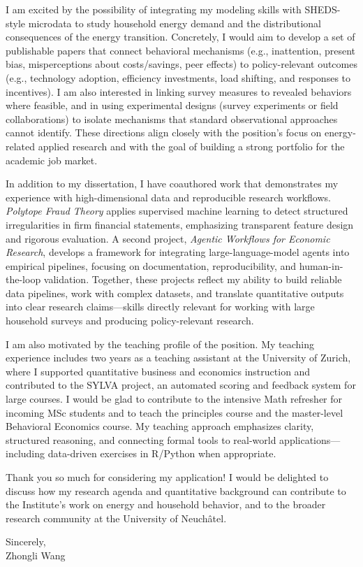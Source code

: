 \documentclass[11pt]{article}
\begin{document}
I am excited by the possibility of integrating my modeling skills with SHEDS-style microdata to study household energy demand and the distributional consequences of the energy transition. 
Concretely, I would aim to develop a set of publishable papers that connect behavioral mechanisms (e.g., inattention, present bias, misperceptions about costs/savings, peer effects) to policy-relevant outcomes (e.g., technology adoption, efficiency investments, load shifting, and responses to incentives). 
I am also interested in linking survey measures to revealed behaviors where feasible, and in using experimental designs (survey experiments or field collaborations) to isolate mechanisms that standard observational approaches cannot identify. 
These directions align closely with the position's focus on energy-related applied research and with the goal of building a strong portfolio for the academic job market.

In addition to my dissertation, I have coauthored work that demonstrates my experience with high-dimensional data and reproducible research workflows. 
\textit{Polytope Fraud Theory} applies supervised machine learning to detect structured irregularities in firm financial statements, emphasizing transparent feature design and rigorous evaluation. 
A second project, \textit{Agentic Workflows for Economic Research}, develops a framework for integrating large-language-model agents into empirical pipelines, focusing on documentation, reproducibility, and human-in-the-loop validation. 
Together, these projects reflect my ability to build reliable data pipelines, work with complex datasets, and translate quantitative outputs into clear research claims---skills directly relevant for working with large household surveys and producing policy-relevant research.

I am also motivated by the teaching profile of the position. 
My teaching experience includes two years as a teaching assistant at the University of Zurich, where I supported quantitative business and economics instruction and contributed to the SYLVA project, an automated scoring and feedback system for large courses. 
I would be glad to contribute to the intensive Math refresher for incoming MSc students and to teach the principles course and the master-level Behavioral Economics course. 
My teaching approach emphasizes clarity, structured reasoning, and connecting formal tools to real-world applications---including data-driven exercises in R/Python when appropriate.

Thank you so much for considering my application!
I would be delighted to discuss how my research agenda and quantitative background can contribute to the Institute's work on energy and household behavior, and to the broader research community at the University of Neuch\^{a}tel.

\vspace{6mm}

\noindent Sincerely,\\[12mm]
\noindent Zhongli Wang
\end{document}
